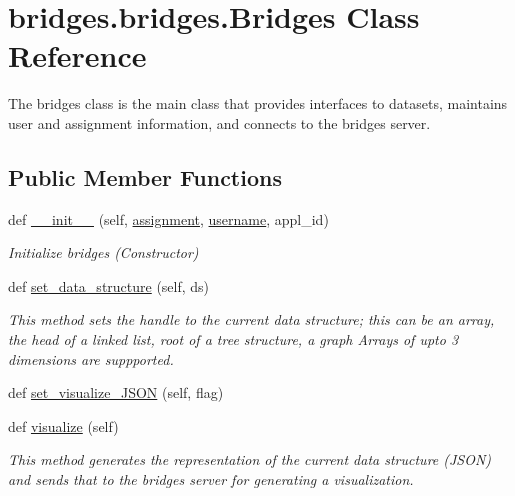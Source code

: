 \hypertarget{classbridges_1_1bridges_1_1_bridges}{}\section{bridges.\+bridges.\+Bridges Class Reference}
\label{classbridges_1_1bridges_1_1_bridges}


The bridges class is the main class that provides interfaces to datasets, maintains user and assignment information, and connects to the bridges server.  


\subsection*{Public Member Functions}
\begin{DoxyCompactItemize}
\item 
def \mbox{\hyperlink{classbridges_1_1bridges_1_1_bridges_af174072883f6f269a9fe7cc02e12c276}{\+\_\+\+\_\+init\+\_\+\+\_\+}} (self, \mbox{\hyperlink{classbridges_1_1bridges_1_1_bridges_a2752e73a21f14efb9382217fcd431960}{assignment}}, \mbox{\hyperlink{classbridges_1_1bridges_1_1_bridges_a492041cbcac828d5a26fcad8515fb221}{username}}, appl\+\_\+id)
\begin{DoxyCompactList}\small\item\em Initialize bridges (Constructor) \end{DoxyCompactList}\item 
def \mbox{\hyperlink{classbridges_1_1bridges_1_1_bridges_a868f02fa66c87c1a1fc7bd6fbc799291}{set\+\_\+data\+\_\+structure}} (self, ds)
\begin{DoxyCompactList}\small\item\em This method sets the handle to the current data structure; this can be an array, the head of a linked list, root of a tree structure, a graph Arrays of upto 3 dimensions are suppported. \end{DoxyCompactList}\item 
def \mbox{\hyperlink{classbridges_1_1bridges_1_1_bridges_ab50d018b5178ca33de24157b7b6de285}{set\+\_\+visualize\+\_\+\+J\+S\+ON}} (self, flag)
\item 
def \mbox{\hyperlink{classbridges_1_1bridges_1_1_bridges_a3c1321f8be7b249639a47eba10b67c70}{visualize}} (self)
\begin{DoxyCompactList}\small\item\em This method generates the representation of the current data structure (J\+S\+ON) and sends that to the bridges server for generating a visualization. \end{DoxyCompactList}\item 

\end{DoxyCompactItemize}
